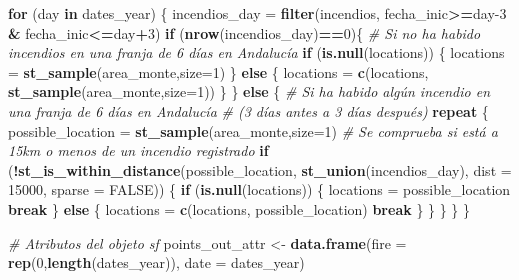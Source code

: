 \documentclass[12pt,a4paper,]{book}
\newenvironment{Shaded}{\begin{snugshade}}{\end{snugshade}}
\newcommand{\AttributeTok}[1]{\textcolor[rgb]{0.13,0.29,0.53}{#1}}
\newcommand{\CommentTok}[1]{\textcolor[rgb]{0.56,0.35,0.01}{\textit{#1}}}
\newcommand{\ConstantTok}[1]{\textcolor[rgb]{0.56,0.35,0.01}{#1}}
\newcommand{\ControlFlowTok}[1]{\textcolor[rgb]{0.13,0.29,0.53}{\textbf{#1}}}
\newcommand{\DecValTok}[1]{\textcolor[rgb]{0.00,0.00,0.81}{#1}}
\newcommand{\FunctionTok}[1]{\textcolor[rgb]{0.13,0.29,0.53}{\textbf{#1}}}
\newcommand{\NormalTok}[1]{#1}
\newcommand{\OtherTok}[1]{\textcolor[rgb]{0.56,0.35,0.01}{#1}}
\newcommand{\SpecialCharTok}[1]{\textcolor[rgb]{0.81,0.36,0.00}{\textbf{#1}}}
\numberwithin{dummy}{section}
\theoremstyle{ocrenumbox}
\theoremstyle{blacknumex}
\theoremstyle{blacknumbox}
\theoremstyle{ocrenum}
\theoremstyle{ocrenum}
\begin{document}
\begin{Shaded}
\begin{Highlighting}[]
\ControlFlowTok{for}\NormalTok{ (day }\ControlFlowTok{in}\NormalTok{ dates\_year) \{}
\NormalTok{  incendios\_day }\OtherTok{=} \FunctionTok{filter}\NormalTok{(incendios,}
\NormalTok{                         fecha\_inic}\SpecialCharTok{\textgreater{}=}\NormalTok{day}\DecValTok{{-}3} \SpecialCharTok{\&}\NormalTok{ fecha\_inic}\SpecialCharTok{\textless{}=}\NormalTok{day}\SpecialCharTok{+}\DecValTok{3}\NormalTok{)}
  \ControlFlowTok{if}\NormalTok{ (}\FunctionTok{nrow}\NormalTok{(incendios\_day)}\SpecialCharTok{==}\DecValTok{0}\NormalTok{)\{ }
    \CommentTok{\# Si no ha habido incendios en una franja de 6 días en Andalucía}
    \ControlFlowTok{if}\NormalTok{ (}\FunctionTok{is.null}\NormalTok{(locations)) \{}
\NormalTok{      locations }\OtherTok{=} \FunctionTok{st\_sample}\NormalTok{(area\_monte,}\AttributeTok{size=}\DecValTok{1}\NormalTok{) }
\NormalTok{    \} }\ControlFlowTok{else}\NormalTok{ \{}
\NormalTok{      locations }\OtherTok{=} \FunctionTok{c}\NormalTok{(locations, }\FunctionTok{st\_sample}\NormalTok{(area\_monte,}\AttributeTok{size=}\DecValTok{1}\NormalTok{))}
\NormalTok{    \}}
\NormalTok{  \} }\ControlFlowTok{else}\NormalTok{ \{ }
    \CommentTok{\# Si ha habido algún incendio en una franja de 6 días en Andalucía }
    \CommentTok{\# (3 días antes a 3 días después)}
    \ControlFlowTok{repeat}\NormalTok{ \{}
\NormalTok{      possible\_location }\OtherTok{=} \FunctionTok{st\_sample}\NormalTok{(area\_monte,}\AttributeTok{size=}\DecValTok{1}\NormalTok{)}
      \CommentTok{\# Se comprueba si está a 15km o menos de un incendio registrado}
      \ControlFlowTok{if}\NormalTok{ (}\SpecialCharTok{!}\FunctionTok{st\_is\_within\_distance}\NormalTok{(possible\_location, }
                                 \FunctionTok{st\_union}\NormalTok{(incendios\_day), }
                                 \AttributeTok{dist =} \DecValTok{15000}\NormalTok{, }\AttributeTok{sparse =} \ConstantTok{FALSE}\NormalTok{)) \{}
        \ControlFlowTok{if}\NormalTok{ (}\FunctionTok{is.null}\NormalTok{(locations)) \{}
\NormalTok{          locations }\OtherTok{=}\NormalTok{ possible\_location}
          \ControlFlowTok{break}
\NormalTok{        \} }\ControlFlowTok{else}\NormalTok{ \{}
\NormalTok{          locations }\OtherTok{=} \FunctionTok{c}\NormalTok{(locations, possible\_location)}
          \ControlFlowTok{break}
\NormalTok{        \}}
\NormalTok{      \}}
\NormalTok{    \}}
\NormalTok{  \}}
\NormalTok{\}}

\CommentTok{\# Atributos del objeto sf  }
\NormalTok{points\_out\_attr }\OtherTok{\textless{}{-}} \FunctionTok{data.frame}\NormalTok{(}\AttributeTok{fire =} \FunctionTok{rep}\NormalTok{(}\DecValTok{0}\NormalTok{,}\FunctionTok{length}\NormalTok{(dates\_year)),}
                              \AttributeTok{date =}\NormalTok{ dates\_year)}
  

\end{Highlighting}
\end{Shaded}
\end{document}
